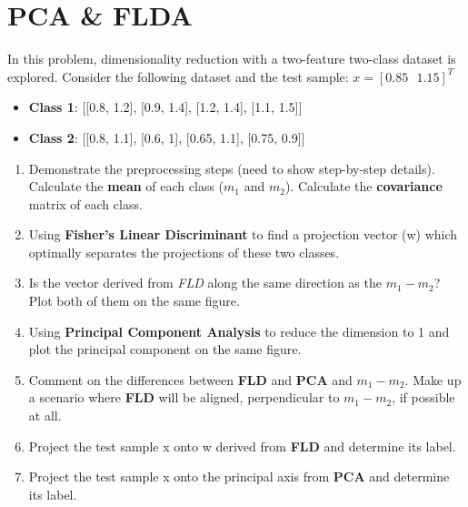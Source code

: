 \documentclass[12pt]{article}
\numberwithin{equation}{section}
\numberwithin{table}{section}
\numberwithin{figure}{section}
\begin{document}
\section{PCA \& FLDA}
In this problem, dimensionality reduction with a two-feature two-class dataset is explored. Consider the following dataset and the test sample: $x = [0.85\ \ \ 1.15]^T$
\begin{itemize}
	\item 	\textbf{Class 1}: [[0.8, 1.2], [0.9, 1.4], [1.2, 1.4], [1.1, 1.5]]
	\item \textbf{Class 2}: [[0.8, 1.1], [0.6, 1], [0.65, 1.1], [0.75, 0.9]]
\end{itemize}
\begin{enumerate}[label=(\alph*)]
	\item Demonstrate the preprocessing steps (need to show step-by-step details). Calculate the \textbf{mean} of each class ($m_1$ and $m_2$). Calculate the \textbf{covariance} matrix of each class.
	
	\item Using \textbf{Fisher's Linear Discriminant} to find a projection vector (w) which optimally separates the projections of these two classes.
	
	\item Is the vector derived from \textit{FLD} along the same direction as the  $m_1 - m_2$? Plot both of them on the same figure.
	
	\item Using \textbf{Principal Component Analysis} to reduce the dimension to 1 and plot the principal component on the same figure.
	
	\item Comment on the differences between \textbf{FLD} and \textbf{PCA} and $m_1 - m_2$. Make up a scenario where \textbf{FLD} will be aligned, perpendicular to $m_1 - m_2$, if possible at all.
	
	\item Project the test sample x onto w derived from \textbf{FLD} and determine its label.
	
	\item Project the test sample x onto the principal axis from \textbf{PCA} and determine its label.
\end{enumerate}
\end{document}
